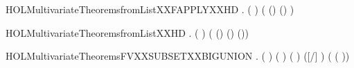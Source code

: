 \newcommand{\HOLMultivariateTheoremsfromListXXFAPPLYXXELYY}{\UseVerbatim{HOLMultivariateTheoremsfromListXXFAPPLYXXELYY}}
\begin{SaveVerbatim}{HOLMultivariateTheoremsfromListXXFAPPLYXXHD}
\HOLTokenTurnstile{} \HOLSymConst{\HOLTokenForall{}}    .
       \HOLSymConst{\HOLTokenNeg{}}   \HOLSymConst{\HOLTokenConj{}}   \HOLSymConst{\HOLTokenConj{}} (  \HOLSymConst{=}  ) \HOLSymConst{\HOLTokenImp{}}
       ( (\HOLSymConst{::}) (\HOLSymConst{::})   \HOLSymConst{=} )
\end{SaveVerbatim}
\newcommand{\HOLMultivariateTheoremsfromListXXFAPPLYXXHD}{\UseVerbatim{HOLMultivariateTheoremsfromListXXFAPPLYXXHD}}
\begin{SaveVerbatim}{HOLMultivariateTheoremsfromListXXHD}
\HOLTokenTurnstile{} \HOLSymConst{\HOLTokenForall{}}   .
       \HOLSymConst{\HOLTokenNeg{}}   \HOLSymConst{\HOLTokenConj{}} (  \HOLSymConst{=}  ) \HOLSymConst{\HOLTokenImp{}}
       ( (\HOLSymConst{::}) (\HOLSymConst{::}) \HOLSymConst{=}    \HOLSymConst{|+} (\HOLSymConst{,}))
\end{SaveVerbatim}
\newcommand{\HOLMultivariateTheoremsfromListXXHD}{\UseVerbatim{HOLMultivariateTheoremsfromListXXHD}}
\begin{SaveVerbatim}{HOLMultivariateTheoremsFVXXSUBSETXXBIGUNION}
\HOLTokenTurnstile{} \HOLSymConst{\HOLTokenForall{}}  .
         \HOLSymConst{\HOLTokenConj{}} (  \HOLSymConst{=}  ) \HOLSymConst{\HOLTokenConj{}}
        ( ) ( ) \HOLSymConst{\HOLTokenImp{}}
        ([/] ) \HOLConst{\HOLTokenSubset{}}   \HOLConst{\HOLTokenUnion{}}  (  ( ))
\end{SaveVerbatim}
